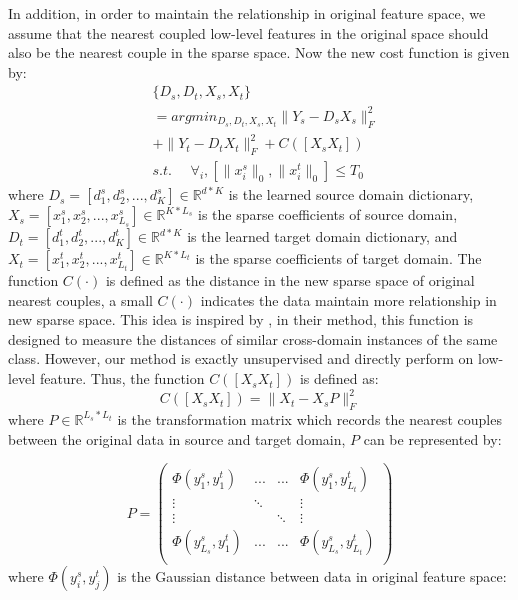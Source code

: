\documentclass{article}
\begin{document}
In addition, in order to maintain the relationship in original feature space, we assume that the nearest coupled low-level features in the original space should also be the nearest couple in the sparse space. Now the new cost function is given by:
\begin{equation}
\begin{split}
&\{D_s,D_t,X_s,X_t\}\\
&=arg min_{D_s,D_t,X_s,X_t}\|Y_s - D_s X_s\|^2_F \\
& + \|Y_t - D_t X_t\|
^2_F + C([X_s X_t]) \\
&s.t. \text{ }\text{ } \forall_i, [\|x_i^s\|_0 ,  \|x_i^t\|_0] \le T_0
\end{split}
\end{equation}
where
\(D_s=[d_1^s,d_2^s,...,d_K^s]\in\mathbb{R}^{d*K}\) is the learned source domain dictionary,
\(X_s=[x_1^s,x_2^s,...,x_{L_s}^s]\in\mathbb{R}^{K*L_s}\) is the sparse coefficients of source domain,
\(D_t=[d_1^t,d_2^t,...,d_K^t]\in\mathbb{R}^{d*K}\) is the learned target domain dictionary, and
\(X_t=[x_1^t,x_2^t,...,x_{L_t}^t]\in\mathbb{R}^{K*L_t}\) is the sparse coefficients of target domain. The function
\(C(\cdot)\) is defined as the distance in the new sparse space of original nearest couples, a small \(C(\cdot)\) indicates the data maintain more relationship in new sparse space. This idea is inspired by \cite{zhu2013enhancing,zhu2014weakly}, in their method, this function is designed to measure the distances of similar cross-domain instances of the same class. However, our method is exactly unsupervised and directly perform on low-level feature.  Thus, the function
\(C([X_s X_t])\) is defined as:
\begin{equation}
C([X_s X_t])=\|X_t-X_s P\|_F^2
\end{equation}
where
\(P\in\mathbb{R}^{L_s*L_t}\) is the transformation matrix which records the nearest couples between the original data in source and target domain,
\(P\) can be represented by:

\begin{equation}       %
P=\left(                 %
  \begin{array}{cccc}   %
    \Phi(y_1^s,y_1^t) & ... & ... & \Phi(y_1^s,y_{L_t}^t)\\  %
    \vdots & \ddots & & \vdots \\
    \vdots & & \ddots &  \vdots \\
    \Phi(y_{L_s}^s,y_1^t) & ... & ... & \Phi(y_{L_s}^s,y_{L_t}^t)\\  %
  \end{array}
\right)                 %
\end{equation}
where
$\Phi(y_i^s,y_j^t)$ is the Gaussian distance between data in original feature space:
\end{document}
